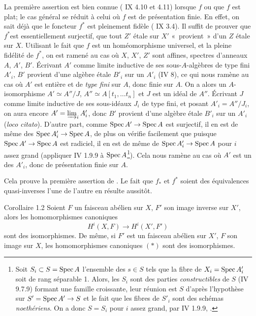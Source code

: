 \documentclass[10pt]{../fichiers-configuration-latex/smfart}
\begin{document}
La première assertion est bien connue (\SGA{} IX 4.10 et 4.11) lorsque
$f$  ou que $f$ est plat; le cas général se
réduit à celui où $f$ est de présentation  finie. En effet, on sait
déjà que le foncteur $f^{\ast}$ est pleinement fidèle ( IX
3.4). Il suffit de prouver que $f^{\ast}$\pageoriginale  est
essentiellement surjectif, \ie que tout $Z'$ étale sur $X'$ « provient » d'un $Z$ étale sur $X$. Utilisant le fait que $f$ est
un homéomorphisme universel, et la pleine fidélité de $f^{\ast}$, on
est ramené au cas où $X$, $X'$, $Z'$ sont affines, spectres
d'anneaux $A$, $A'$, $B'$. Écrivant $A'$ comme limite inductive de
ses sous-$A$-algèbres de type fini $A'_{i}$, $B'$ provient d'une
algèbre étale $B'_{i}$ sur un $A'_{i}$ (\cf \EGA IV 8), ce qui nous
ramène au cas où $A'$ est entière et de \emph{type fini} sur $A$,
donc finie sur $A$. On a alors un $A$-isomorphisme $A'\simeq A''/J$,
 $A'' \simeq A [t_1, \ldots t_n]$ et $J$ est un idéal de $A''$.
Écrivant $J$ comme limite inductive de ses sous-idéaux $J_i$ de type
fini, et posant $A'_i = A'' /J_i$, on aura encore $A' = \varinjlim_i
A'_{i}$, donc $B'$ provient d'une algèbre étale $B'_i$ sur un $A'_i$
(\emph{loco citato}). D'autre part, comme $\Spec A'\to \Spec A$ est
surjectif, il en est de même des $\Spec A'_i \to \Spec A$, de plus
on vérifie facilement que puisque $\Spec A'\to \Spec A$ est
radiciel, il en est de même de $\Spec A'_i \to \Spec A$ pour $i$
assez grand (appliquer \EGA IV 1.9.9 à $\operatorname{Spec} A$\footnote{Soit $S_i
\subset S =
  \operatorname{Spec} A$ l'ensemble des $s \in S$ tels que la fibre de $X_i = \operatorname{Spec}
  A'_i$  soit de rang séparable 1. Alors, les $S_i$ sont des
  parties \emph{constructibles} de $S$ (\EGA IV 9.7.9) formant une
  famille croissante, leur réunion est $S$ d'après l'hypothèse sur $S'=
  \Spec A'\to S$ et le fait que les fibres de $S'_i$ sont des
  schémas \emph{noethériens}. On a donc $S = S_i$ pour $i$ assez
  grand, par \EGA IV 1.9.9, \cqfd.}). Cela nous ramène au cas où $A'$
est un des $A'_i$, donc de présentation finie sur $A$.

Cela prouve la première assertion de .
Le fait que $f_{\ast}$ et
$f^{\ast}$ soient des équivalences quasi-inverses l'une de l'autre en
résulte aussitôt.

\begin{enonce*}{Corollaire 1.2}
Soient $F$ un faisceau abélien sur $X$, $F'$ son image inverse sur
$X'$, alors les homomorphismes canoniques
\begin{equation*}
H^{i} (X, F) \to H^{i} (X', F')\tag{$\ast$}
\end{equation*}
sont des isomorphismes. De même, si $F'$ est un faisceau abélien sur
$X'$, $F$ son image sur $X$, les homomorphismes canoniques $(\ast)$
sont des isomorphismes.
\end{enonce*}
\end{document}
